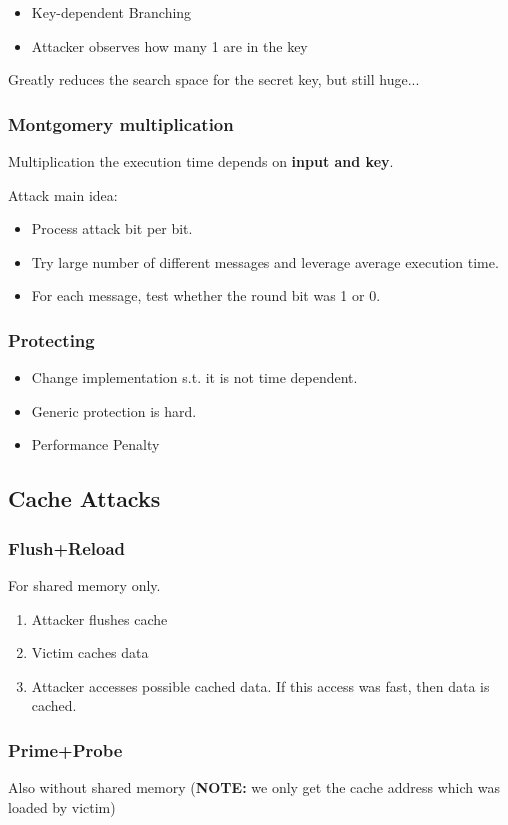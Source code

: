 \begin{itemize}
  \item Key-dependent Branching
  \item Attacker observes how many 1 are in the key
\end{itemize}
Greatly reduces the search space for the secret key, but still huge...

\subsubsection{Montgomery multiplication}
Multiplication the execution time depends on \textbf{input and key}.

Attack main idea:
\begin{itemize}
  \item Process attack bit per bit.
  \item Try large number of different messages and leverage average execution
    time.
  \item For each message, test whether the round bit was 1 or 0.
\end{itemize}

\subsubsection{Protecting}
\begin{itemize}
  \item Change implementation s.t. it is not time dependent.
  \item Generic protection is hard.
  \item Performance Penalty
\end{itemize}


\subsection{Cache Attacks}
\subsubsection{Flush+Reload}
For shared memory only.
\begin{enumerate}
	\item Attacker flushes cache
	\item Victim caches data
	\item Attacker accesses possible cached data. If this access was fast,
	  then data is cached.
\end{enumerate}
\subsubsection{Prime+Probe}
    Also without shared memory (\textbf{NOTE:} we only get the cache address
    which was loaded by victim)

